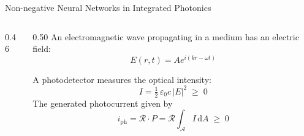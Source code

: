 \begin{frame}{Non-negative Neural Networks in Integrated Photonics}
\begin{columns}[T]
\begin{column}{0.46\textwidth}
\begin{center}
  \end{center}

  \vspace{1.2em}
\end{column}

\hfill
\begin{column}{0.50\textwidth}
  An electromagnetic wave propagating in a medium has an electric field:
  \[E(r, t) = A e^{i(kr - \omega t)}\]

  A photodetector measures the optical intensity:
  \[
    I = \tfrac{1}{2}\,\varepsilon_0 c\,|E|^2 \;\geq\; 0
  \]
  The generated photocurrent given by
  \[
    i_{\mathrm{ph}} = \mathcal{R}\cdot P = \mathcal{R}
    \int_{\!\mathcal{A}} I\,\mathrm{d}A \;\geq\; 0
  \]



\end{column}
\end{columns}
\vspace{-20pt}
\begin{center}
\end{center}
\end{frame}



